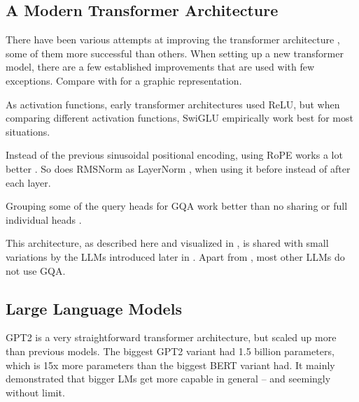 
\subsection{A Modern Transformer Architecture}\label{sub:modern}

There have been various attempts at improving the transformer architecture \cite{shazeer_glu_2020, su_roformer_2022, ainslie_gqa_2023, bolya_hydra_2022, sukhbaatar_adaptive_2019, lu_understanding_2019, ye_understanding_2023, wu_memorizing_2022}, some of them more successful than others.
When setting up a new transformer model, there are a few established improvements that are used with few exceptions.
Compare with  for a graphic representation.

As activation functions, early transformer architectures used \gls{ReLU}, but when comparing different activation functions, \gls{SwiGLU} \cite{shazeer_glu_2020} empirically work best for most situations.

Instead of the previous sinusoidal positional encoding, using \gls{RoPE} works a lot better \cite{su_roformer_2022}. So does RMSNorm as LayerNorm \cite{ba_layer_2016}, when using it before instead of after each layer.

Grouping some of the query heads for \gls{GQA} \cite{ainslie_gqa_2023} work better than no sharing or full individual heads \cite{bolya_hydra_2022}.



This architecture, as described here and visualized in , is shared with small variations by the \glspl{LLM} introduced later in .
Apart from , most other \glspl{LLM} do not use \gls{GQA}.

\subsection{Large Language Models}\label{sub:llm}

\gls{GPT2} \cite{radford_language_2019} is a very straightforward transformer architecture, but scaled up more than previous models.
The biggest \gls{GPT2} variant had 1.5 billion parameters, which is 15x more parameters than the biggest \gls{BERT} variant had.
It mainly demonstrated that bigger \glspl{LM} get more capable in general -- and seemingly without limit.

